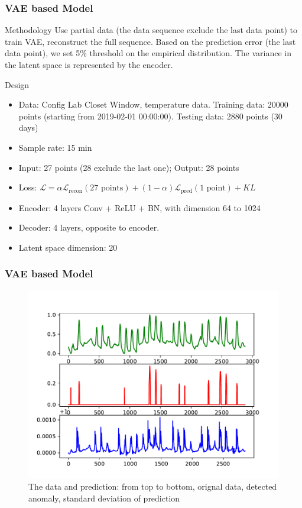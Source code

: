 \documentclass{beamer}
\begin{document}
\begin{frame}
\frametitle{VAE based Model}

\begin{block}{Methodology}
Use partial data (the data sequence exclude the last data point) to train VAE, reconstruct the full sequence. Based on the prediction error (the last data point), we set 5\% threshold on the empirical distribution. The variance in the latent space is represented by the encoder.
\end{block}

\begin{block}{Design}
\begin{itemize}
\setlength\itemsep{0em}
\item Data: Config Lab Closet Window, temperature data. Training data: 20000 points (starting from 2019-02-01 00:00:00). Testing data: 2880 points (30 days)
\item Sample rate: 15 min
\item Input: 27 points (28 exclude the last one); Output: 28 points
\item Loss: $\mathcal{L} = \alpha \mathcal{L}_{\text{recon}}(\text{27 points}) + (1-\alpha) \mathcal{L}_{\text{pred}}(\text{1 point}) + KL$
\item Encoder: 4 layers Conv + ReLU + BN, with dimension 64 to 1024 \\
\item Decoder: 4 layers, opposite to encoder. \\
\item Latent space dimension: 20
\end{itemize}
\end{block}

\end{frame}


\begin{frame}
\frametitle{VAE based Model}
\begin{figure}
\includegraphics[width=0.8\linewidth]{figs/vae_h20_detect.pdf}
\vspace{-0.3in}
\caption{The data and prediction: from top to bottom, orignal data, detected anomaly, standard deviation of prediction}
\end{figure}
\end{frame}
\end{document}
